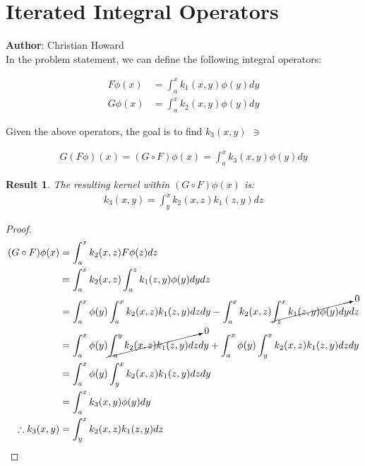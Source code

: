 \documentclass{article}[11pt]
\author{Christian Howard}
\newtheorem{lemma}{Result}[section]
\begin{document}
   
   \section{Iterated Integral Operators}
   \textbf{Author}: Christian Howard \\
   In the problem statement, we can define the following integral operators:
   
   \begin{align}
   F \phi (x) &= \int_a^x k_1(x,y) \phi(y) dy \\
   G \phi (x) &= \int_a^x k_2(x,y) \phi(y) dy 
   \end{align}
   
   Given the above operators, the goal is to find $k_3(x,y)$ $\ni$
   
   \begin{align}
   G(F\phi)(x) = (G \circ F)\phi(x) = \int_a^x k_3(x,y) \phi(y) dy
   \end{align}
   
   
   \begin{lemma}
   The resulting kernel within $(G \circ F)\phi(x)$ is:
	   \begin{align*}
	   k_3(x,y) = \int_y^x k_2(x,z) k_1(z,y) dz 
	   \end{align*}
   \end{lemma}
   
   \begin{proof}
   \begin{align*}
   (G \circ F)\phi(x) &= \int_a^x k_2(x,z) F\phi(z) dz \\
   &= \int_a^x k_2(x,z) \int_a^z k_1(z,y) \phi(y) dy dz \\
   &= \int_a^x \phi(y) \int_a^x k_2(x,z) k_1(z,y)  dz dy - \int_a^x k_2(x,z) \cancelto{0}{\int_z^x k_1(z,y) \phi(y) dy} dz \\
   &= \int_a^x \phi(y) \cancelto{0}{\int_a^y k_2(x,z) k_1(z,y)  dz} dy + \int_a^x \phi(y) \int_y^x k_2(x,z) k_1(z,y)  dz dy \\
   &=  \int_a^x \phi(y) \int_y^x k_2(x,z) k_1(z,y)  dz dy \\
   &=  \int_a^x k_3(x,y) \phi(y) dy \\
   \therefore k_3(x,y) &= \int_y^x k_2(x,z) k_1(z,y) dz
   \end{align*}
   \end{proof}
   
\end{document}
